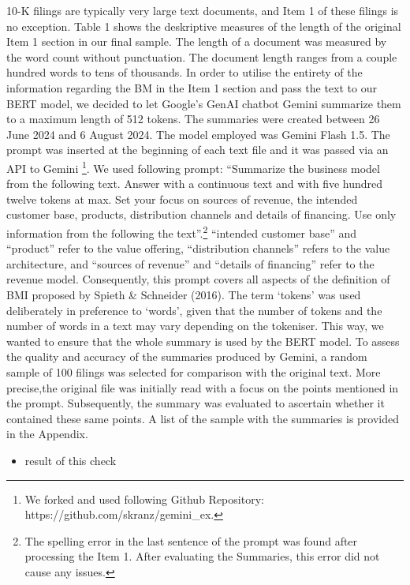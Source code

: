 \documentclass[
]{article}
\providecommand{\tightlist}{%
  \setlength{\itemsep}{0pt}\setlength{\parskip}{0pt}}\usepackage{longtable,booktabs,array}
\begin{document}
10-K filings are typically very large text documents, and Item 1 of
these filings is no exception. Table 1 shows the deskriptive measures of
the length of the original Item 1 section in our final sample. The
length of a document was measured by the word count without punctuation.
The document length ranges from a couple hundred words to tens of
thousands. In order to utilise the entirety of the information regarding
the BM in the Item 1 section and pass the text to our BERT model, we
decided to let Google's GenAI chatbot Gemini summarize them to a maximum
length of 512 tokens. The summaries were created between 26 June 2024
and 6 August 2024. The model employed was Gemini Flash 1.5. The prompt
was inserted at the beginning of each text file and it was passed via an
API to Gemini \footnote{We forked and used following Github Repository:
  https://github.com/skranz/gemini\_ex.}. We used following prompt:
``Summarize the business model from the following text. Answer with a
continuous text and with five hundred twelve tokens at max. Set your
focus on sources of revenue, the intended customer base, products,
distribution channels and details of financing. Use only information
from the following the text''.\footnote{The spelling error in the last
  sentence of the prompt was found after processing the Item 1. After
  evaluating the Summaries, this error did not cause any issues.}
``intended customer base'' and ``product'' refer to the value offering,
``distribution channels'' refers to the value architecture, and
``sources of revenue'' and ``details of financing'' refer to the revenue
model. Consequently, this prompt covers all aspects of the definition of
BMI proposed by Spieth \& Schneider (2016). The term `tokens' was used
deliberately in preference to `words', given that the number of tokens
and the number of words in a text may vary depending on the tokeniser.
This way, we wanted to ensure that the whole summary is used by the BERT
model. To assess the quality and accuracy of the summaries produced by
Gemini, a random sample of 100 filings was selected for comparison with
the original text. More precise,the original file was initially read
with a focus on the points mentioned in the prompt. Subsequently, the
summary was evaluated to ascertain whether it contained these same
points. A list of the sample with the summaries is provided in the
Appendix.

\begin{itemize}
\tightlist
\item
  result of this check
\end{itemize}
\end{document}
